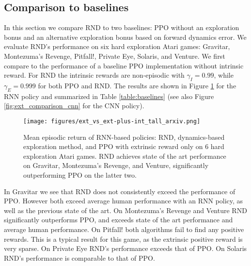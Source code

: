 \documentclass{article} \usepackage[dvipsnames]{xcolor}
\begin{document}
\subsection{Comparison to baselines}
\label{sec:baselines}
In this section we compare RND to two baselines: PPO without an exploration bonus and an alternative exploration bonus based on forward dynamics error. We evaluate RND's performance on six hard exploration Atari games: Gravitar, Montezuma's Revenge, Pitfall!, Private Eye, Solaris, and Venture. We first compare to the performance of a baseline PPO implementation without intrinsic reward. For RND the intrinsic rewards are non-episodic with  $\gamma_I=0.99$, while $\gamma_E =0.999$ for both PPO and RND. The results are shown in Figure \ref{fig:ext_comparison} for the RNN policy and summarized in Table \ref{table:baselines} (see also Figure \ref{fig:ext_comparison_cnn} for the CNN policy).

\begin{figure}[h!]
\centering
\texttt{[image: figures/ext\_vs\_ext-plus-int\_tall\_arxiv.png]}
\caption{Mean episodic return of RNN-based policies: RND, dynamics-based exploration method, and PPO with extrinsic reward only on 6 hard exploration Atari games. RND achieves state of the art performance on Gravitar, Montezuma's Revenge, and Venture, significantly outperforming PPO on the latter two.}
\label{fig:ext_comparison}
\vspace*{-8pt}
\end{figure}

In Gravitar we see that RND does not consistently exceed the performance of PPO. However both exceed average human performance with an RNN policy, as well as the previous state of the art. On Montezuma's Revenge and Venture RND significantly outperforms PPO, and exceeds state of the art performance and average human performance. On Pitfall! both algorithms fail to find any positive rewards. This is a typical result for this game, as the extrinsic positive reward is very sparse. On Private Eye RND's performance exceeds that of PPO. On Solaris RND's performance is comparable to that of PPO. 
\end{document}
